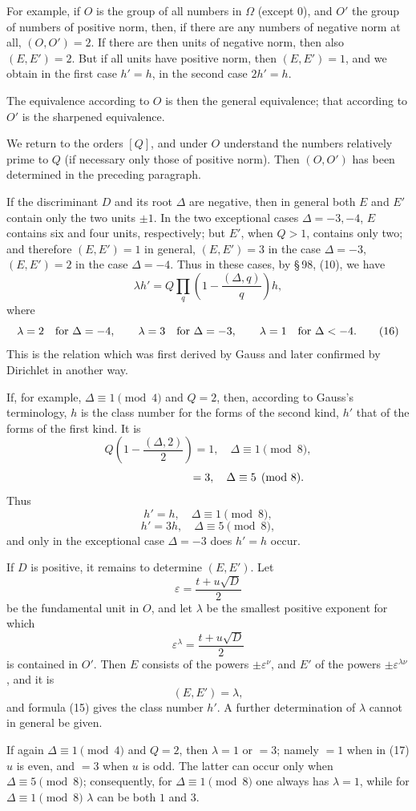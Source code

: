 \documentclass[11pt]{article}
\begin{document}
For example, if \(O\) is the group of all numbers in \(\Omega\) (except \(0\)), and \(O'\) the group of numbers of positive norm, then, if there are any numbers of negative norm at all, \((O,O')=2\). If there are then units of negative norm, then also \((E,E')=2\). But if all units have positive norm, then \((E,E')=1\), and we obtain in the first case \(h'=h\), in the second case \(2h'=h\).

The equivalence according to \(O\) is then the general equivalence; that according to \(O'\) is the sharpened equivalence.

We return to the orders \([Q]\), and under \(O\) understand the numbers relatively prime to \(Q\) (if necessary only those of positive norm). Then \((O,O')\) has been determined in the preceding paragraph.

If the discriminant \(D\) and its root \(\Delta\) are negative, then in general both \(E\) and \(E'\) contain only the two units \(\pm1\). In the two exceptional cases \(\Delta=-3,-4\), \(E\) contains six and four units, respectively; but \(E'\), when \(Q>1\), contains only two; and therefore \((E,E')=1\) in general, \((E,E')=3\) in the case \(\Delta=-3\), \((E,E')=2\) in the case \(\Delta=-4\). Thus in these cases, by \S\,98, (10), we have
\begin{equation}
 \lambda h'=Q\prod_q\left(1-\frac{(\Delta,q)}{q}\right)h,
\tag{15}
\end{equation}
where
\begin{equation}
 \lambda=2\quad\hbox{for }\Delta=-4,\qquad
 \lambda=3\quad\hbox{for }\Delta=-3,\qquad
 \lambda=1\quad\hbox{for }\Delta<-4.
\tag{16}
\end{equation}
This is the relation which was first derived by Gauss and later confirmed by Dirichlet in another way.

If, for example, \(\Delta\equiv1\pmod4\) and \(Q=2\), then, according to Gauss's terminology, \(h\) is the class number for the forms of the second kind, \(h'\) that of the forms of the first kind. It is
\[
 Q\left(1-\frac{(\Delta,2)}{2}\right)=1,\quad \Delta\equiv1\pmod8,
\]
\[
 \hphantom{Q\left(1-\frac{(\Delta,2)}{2}\right)}=3,\quad \Delta\equiv5\pmod8.
\]
Thus
\[
 h'=h,\quad \Delta\equiv1\pmod8,
\]
\[
 h'=3h,\quad \Delta\equiv5\pmod8,
\]
and only in the exceptional case \(\Delta=-3\) does \(h'=h\) occur.

If \(D\) is positive, it remains to determine \((E,E')\). Let
\[
 \varepsilon=\frac{t+u\sqrt D}{2}
\]
be the fundamental unit in \(O\), and let \(\lambda\) be the smallest positive exponent for which
\[
 \varepsilon^\lambda=\frac{t+u\sqrt D}{2}
\]
is contained in \(O'\). Then \(E\) consists of the powers \(\pm\varepsilon^\nu\), and \(E'\) of the powers \(\pm\varepsilon^{\lambda\nu}\), and it is
\[
 (E,E')=\lambda,
\]
and formula (15) gives the class number \(h'\). A further determination of \(\lambda\) cannot in general be given.

If again \(\Delta\equiv1\pmod4\) and \(Q=2\), then \(\lambda=1\) or \(=3\); namely \(=1\) when in (17) \(u\) is even, and \(=3\) when \(u\) is odd. The latter can occur only when \(\Delta\equiv5\pmod8\); consequently, for \(\Delta\equiv1\pmod8\) one always has \(\lambda=1\), while for \(\Delta\equiv1\pmod8\) \(\lambda\) can be both \(1\) and \(3\).
\end{document}
